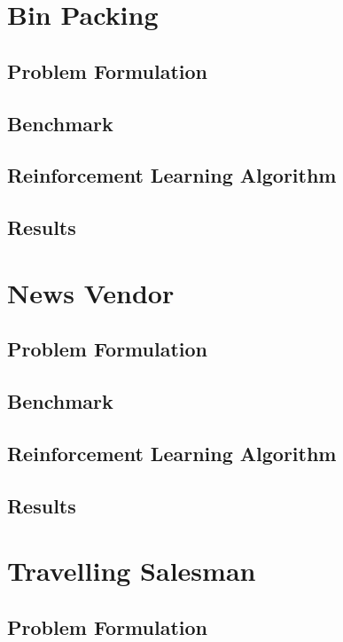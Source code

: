 \documentclass[12pt]{article}
\begin{document}
\section{Bin Packing}

\subsection{Problem Formulation}

\subsection{Benchmark}

\subsection{Reinforcement Learning Algorithm}

\subsection{Results}

\section{News Vendor}

\subsection{Problem Formulation}

\subsection{Benchmark}

\subsection{Reinforcement Learning Algorithm}

\subsection{Results}

\section{Travelling Salesman}

\subsection{Problem Formulation}
\end{document}
